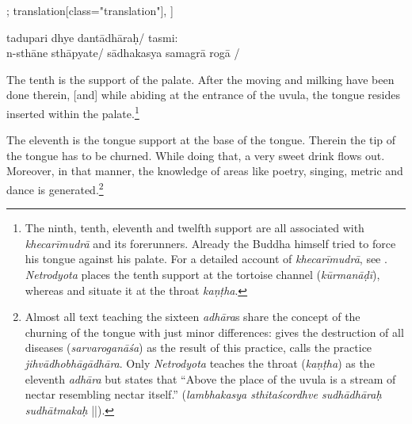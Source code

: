 \begin{alignment}[
  texts=edition[class="edition"];
  translation[class="translation"],
  ]
\begin{edition}
\begin{prose}[p30_04]
tadupari
dhye
dantādhāraḥ/
tasmi:\\n-sthāne
sthāpyate/
sādhakasya samagrā rogā
/
    \end{prose}
  \end{edition}
  \begin{translation}
    \begin{tlate}[p30_04]
      \noindent
      The tenth is the support of the palate. After the moving and milking have been done therein, [and] while abiding at the entrance of the uvula, the tongue resides inserted within the palate.\footnote{The ninth, tenth, eleventh and twelfth support are all associated with \textit{khecarīmudrā} and its forerunners. Already the Buddha himself tried to force his tongue against his palate. For a detailed account of \textit{khecarīmudrā}, see \citeauthor{mallinson2010}. \textit{Netrodyota} places the tenth support at the tortoise channel (\textit{kūrmanāḍī}), whereas  and  situate it at the throat \textit{kaṇṭha}.}
      
      The eleventh is the tongue support at the base of the tongue. Therein the tip of the tongue has to be churned. While doing that, a very sweet drink flows out. Moreover, in that manner, the knowledge of areas like poetry, singing, metric and dance is generated.\footnote{Almost all text teaching the sixteen \textit{adhāra}s share the concept of the churning of the tongue with just minor differences:  gives the destruction of all diseases (\textit{sarvaroganāśa}) as the result of this practice,  calls the practice \textit{jihvādhobhāgādhāra}. Only \textit{Netrodyota} teaches the throat (\textit{kaṇṭha}) as the eleventh \textit{adhāra} but states that ``Above the place of the uvula is a stream of nectar resembling nectar itself.'' (\textit{lambhakasya sthitaścordhve sudhādhāraḥ sudhātmakaḥ} ||).}
    

\end{tlate}
\end{translation}
\end{alignment}
